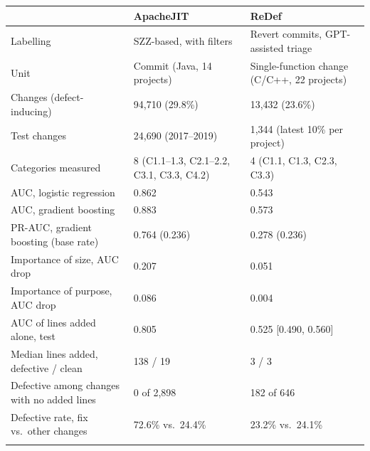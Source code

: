 \begin{tabular*}{\textwidth}{@{\extracolsep\fill}lll}
\toprule
 & ApacheJIT & ReDef \\
\midrule
Labelling & SZZ-based, with filters & Revert commits, GPT-assisted triage \\
Unit & Commit (Java, 14 projects) & Single-function change (C/C++, 22 projects) \\
Changes (defect-inducing) & 94{,}710 (29.8\%) & 13{,}432 (23.6\%) \\
Test changes & 24{,}690 (2017--2019) & 1{,}344 (latest 10\% per project) \\
Categories measured & 8 (C1.1--1.3, C2.1--2.2, C3.1, C3.3, C4.2) & 4 (C1.1, C1.3, C2.3, C3.3) \\
\midrule
AUC, logistic regression & 0.862 & 0.543 \\
AUC, gradient boosting & 0.883 & 0.573 \\
PR-AUC, gradient boosting (base rate) & 0.764 (0.236) & 0.278 (0.236) \\
Importance of size, AUC drop & 0.207 & 0.051 \\
Importance of purpose, AUC drop & 0.086 & 0.004 \\
\midrule
AUC of lines added alone, test & 0.805 & 0.525 [0.490, 0.560] \\
Median lines added, defective / clean & 138 / 19 & 3 / 3 \\
Defective among changes with no added lines & 0 of 2{,}898 & 182 of 646 \\
Defective rate, fix vs.\ other changes & 72.6\% vs.\ 24.4\% & 23.2\% vs.\ 24.1\% \\
\botrule
\end{tabular*}